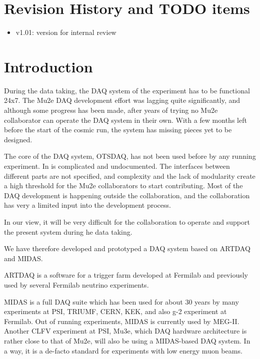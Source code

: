 \documentclass[12pt]{article}
\begin{document}
\section {Revision History and TODO items}

\begin{itemize}
\item
  v1.01: version for internal review
\end{itemize}

% 
\newpage
\section {Introduction}

During the data taking, the DAQ system of the experiment has to be functional 24x7.
The Mu2e DAQ development effort was lagging quite significantly, and although some
progress has been made, after years of trying no Mu2e collaborator can operate
the DAQ system in their own. With a few months left before the start of the cosmic run,
the system has missing pieces yet to be designed.

The core of the DAQ system, OTSDAQ, has not been used before by any running experiment.
In is complicated and undocumented. The interfaces between different parts are not
specified, and complexity and the lack of modularity create a high threshold
for the Mu2e collaborators to start contributing. Most of the DAQ development
is happening outside the collaboration, and the collaboration has very a limited
input into the development process.

In our view, it will be very difficult for the collaboration to operate and support
the present system during he data taking.

We have therefore developed and prototyped a DAQ system based on ARTDAQ and MIDAS.

ARTDAQ is a software for a trigger farm developed at Fermilab and previously used
by several Fermilab neutrino experiments. 

MIDAS is a full DAQ suite which has been used for about 30 years
by many experiments at PSI, TRIUMF, CERN, KEK, and also g-2 experiment
at Fermilab. Out of running experiments, MIDAS is currently used by MEG-II.
Another CLFV experiment at PSI, Mu3e, which DAQ hardware architecture
is rather close to that of Mu2e, will also be using a MIDAS-based DAQ system.
In a way, it is a de-facto standard for experiments with low energy muon beams.
\end{document}
